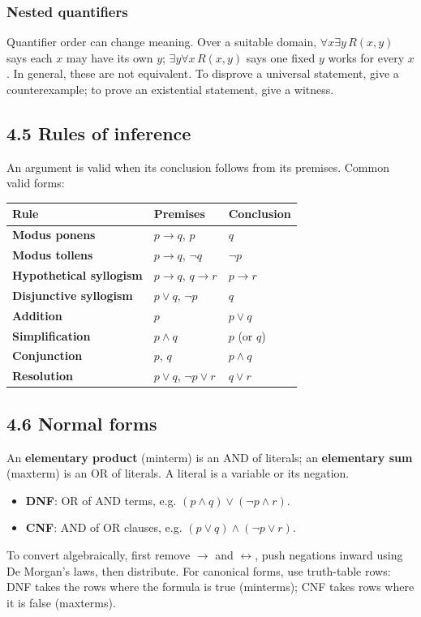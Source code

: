 \documentclass[11pt,a4paper]{article}
\begin{document}
\subsubsection{Nested quantifiers}
Quantifier order can change meaning. Over a suitable domain, $\forall x\exists y\,R(x,y)$ says each $x$ may have its own $y$; $\exists y\forall x\,R(x,y)$ says one fixed $y$ works for every $x$. In general, these are not equivalent. To disprove a universal statement, give a counterexample; to prove an existential statement, give a witness.

\subsection{4.5 Rules of inference}
An argument is valid when its conclusion follows from its premises. Common valid forms:
\begin{center}\small
\begin{tabularx}{\textwidth}{>{\bfseries}p{} X X}
\toprule Rule & Premises & Conclusion\\\midrule
Modus ponens & $p\to q$, $p$ & $q$\\
Modus tollens & $p\to q$, $\neg q$ & $\neg p$\\
Hypothetical syllogism & $p\to q$, $q\to r$ & $p\to r$\\
Disjunctive syllogism & $p\lor q$, $\neg p$ & $q$\\
Addition & $p$ & $p\lor q$\\
Simplification & $p\land q$ & $p$ (or $q$)\\
Conjunction & $p$, $q$ & $p\land q$\\
Resolution & $p\lor q$, $\neg p\lor r$ & $q\lor r$\\
\bottomrule
\end{tabularx}\end{center}

\subsection{4.6 Normal forms}
An \textbf{elementary product} (minterm) is an AND of literals; an \textbf{elementary sum} (maxterm) is an OR of literals. A literal is a variable or its negation.
\begin{itemize}
\item \textbf{DNF}: OR of AND terms, e.g. $(p\land q)\lor(\neg p\land r)$.
\item \textbf{CNF}: AND of OR clauses, e.g. $(p\lor q)\land(\neg p\lor r)$.
\end{itemize}
To convert algebraically, first remove $\to$ and $\leftrightarrow$, push negations inward using De Morgan's laws, then distribute. For canonical forms, use truth-table rows: DNF takes the rows where the formula is true (minterms); CNF takes rows where it is false (maxterms).
\end{document}
